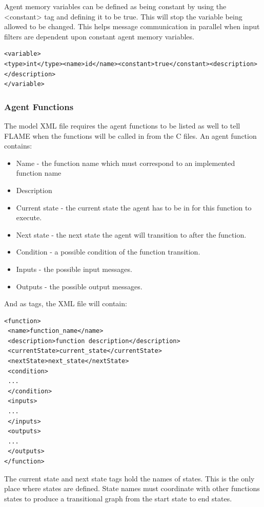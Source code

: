 \documentclass[a4paper,11pt]{article}
\newenvironment{mylisting}
{\begin{list}{}{\setlength{\leftmargin}{1em}}\item\small\bfseries}
{\end{list}}
\begin{document}
Agent memory variables can be defined as being constant by using the
<constant> tag and defining it to be true. This will stop the
variable being allowed to be changed. This helps message
communication in parallel when input filters are dependent upon
constant agent memory variables.
\begin{mylisting}
\begin{verbatim}
<variable>
<type>int</type><name>id</name><constant>true</constant><description></description>
</variable>
\end{verbatim}
\end{mylisting}


\subsubsection{Agent Functions}

The model XML file requires the agent functions to be listed as well
to tell FLAME when the functions will be called in from the C files.
An agent function contains:

\begin{itemize}
\item Name - the function name which must correspond to an implemented function
name
\item Description
\item Current state - the current state the agent has to be in for this function to execute.
\item Next state - the next state the agent will transition to after the function.
\item Condition - a possible condition of the function transition.
\item Inputs - the possible input messages.
\item Outputs - the possible output messages.
\end{itemize}

And as tags, the XML file will contain:

\begin{mylisting}
\begin{verbatim}
<function>
 <name>function_name</name>
 <description>function description</description>
 <currentState>current_state</currentState>
 <nextState>next_state</nextState>
 <condition>
 ...
 </condition>
 <inputs>
 ...
 </inputs>
 <outputs>
 ...
 </outputs>
</function>
\end{verbatim}
\end{mylisting}

The current state and next state tags hold the names of states. This
is the only place where states are defined. State names must
coordinate with other functions states to produce a transitional
graph from the start state to end states.
\end{document}
